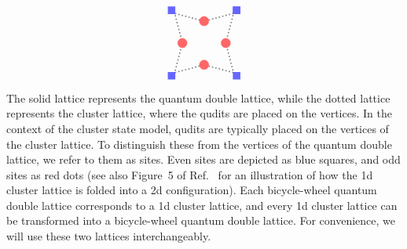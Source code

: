 \documentclass[a4paper,11pt]{article}
\theoremstyle{theorem}
\theoremstyle{remark}
\begin{document}
\begin{equation}
\begin{aligned}
		\begin{tikzpicture}
                \draw[dotted,gray,very thick] (0.95,0.95) -- (0,0.7) -- (-0.95,0.95)-- (-0.7,0) --(-0.95,-0.95)--(0,-0.7)--(0.95,-0.95)--(0.7,0)--(0.95,0.95);
                \draw[blue!60, fill=blue!60,very thick] (0.95,0.95) rectangle ++(0.2,.2);
                \draw[blue!60, fill=blue!60,very thick] (0.95,0.95) rectangle ++(0.2,.2);
                \draw[blue!60, fill=blue!60,very thick] (-0.95,0.95) rectangle ++(-0.2,.2);
                \draw[blue!60, fill=blue!60,very thick] (-0.95,-0.95) rectangle ++(-0.2,-.2);
                \draw[blue!60, fill=blue!60,very thick] (0.95,-0.95) rectangle ++(0.2,-.2);
			\draw [fill = red!60,red!60] (0.7,0) circle (0.15);
               \draw [fill = red!60,red!60] (-0.7,0) circle (0.15);
               \draw [fill = red!60,red!60] (0,0.7) circle (0.15);
               \draw [fill = red!60,red!60] (0,-0.7) circle (0.15);
		\end{tikzpicture}
	\end{aligned}
\end{equation}
The solid lattice represents the quantum double lattice, while the dotted lattice represents the cluster lattice, where the qudits are placed on the vertices. In the context of the cluster state model, qudits are typically placed on the vertices of the cluster lattice. To distinguish these from the vertices of the quantum double lattice, we refer to them as sites. Even sites are depicted as blue squares, and odd sites as red dots (see also Figure~5 of Ref.~\cite{jia2024generalized} for an illustration of how the 1d cluster lattice is folded into a 2d configuration).
Each bicycle-wheel quantum double lattice corresponds to a 1d cluster lattice, and every 1d cluster lattice can be transformed into a bicycle-wheel quantum double lattice. For convenience, we will use these two lattices interchangeably.
\end{document}
